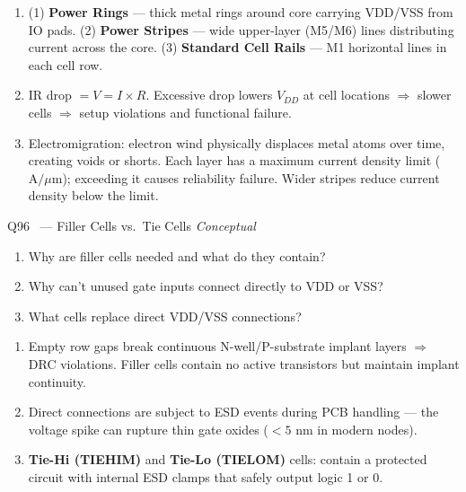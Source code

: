\documentclass[12pt,a4paper]{article}
\newcommand{\advanced}{%
  \fbox{\textcolor{advred}{\bfseries\sffamily\small ADVANCED}}}
\begin{document}
\begin{answerbox}
\begin{enumerate}[label=\textbf{\alph*)}]
  \item (1) \textbf{Power Rings} --- thick metal rings around core carrying VDD/VSS from IO pads. (2) \textbf{Power Stripes} --- wide upper-layer (M5/M6) lines distributing current across the core. (3) \textbf{Standard Cell Rails} --- M1 horizontal lines in each cell row.
  \item IR drop $= V = I \times R$. Excessive drop lowers $V_{DD}$ at cell locations $\Rightarrow$ slower cells $\Rightarrow$ setup violations and functional failure.
  \item Electromigration: electron wind physically displaces metal atoms over time, creating voids or shorts. Each layer has a maximum current density limit ($\text{A}/\mu\text{m}$); exceeding it causes reliability failure. Wider stripes reduce current density below the limit.
\end{enumerate}
\end{answerbox}

\begin{questionbox}{Q96 \advanced\ --- Filler Cells vs.\ Tie Cells \hfill\textit{Conceptual}}
\begin{enumerate}[label=\textbf{\alph*)}]
  \item Why are filler cells needed and what do they contain?
  \item Why can't unused gate inputs connect directly to VDD or VSS?
  \item What cells replace direct VDD/VSS connections?
\end{enumerate}
\end{questionbox}

\begin{answerbox}
\begin{enumerate}[label=\textbf{\alph*)}]
  \item Empty row gaps break continuous N-well/P-substrate implant layers $\Rightarrow$ DRC violations. Filler cells contain no active transistors but maintain implant continuity.
  \item Direct connections are subject to ESD events during PCB handling --- the voltage spike can rupture thin gate oxides ($<5$ nm in modern nodes).
  \item \textbf{Tie-Hi (TIEHIM)} and \textbf{Tie-Lo (TIELOM)} cells: contain a protected circuit with internal ESD clamps that safely output logic 1 or 0.
\end{enumerate}
\end{answerbox}
\end{document}
